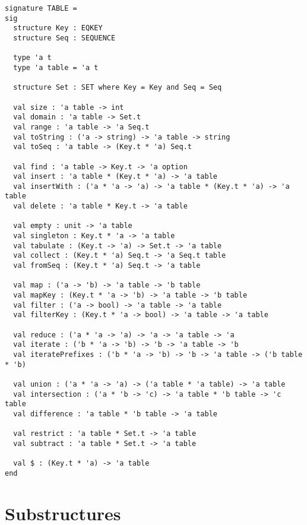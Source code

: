 \begin{cluster}
\label{grp:grm:table-interface::signature}

\begin{gram}
\label{grm:table-interface::signature}
\begin{verbatim}
signature TABLE =
sig
  structure Key : EQKEY
  structure Seq : SEQUENCE

  type 'a t
  type 'a table = 'a t

  structure Set : SET where Key = Key and Seq = Seq

  val size : 'a table -> int
  val domain : 'a table -> Set.t
  val range : 'a table -> 'a Seq.t
  val toString : ('a -> string) -> 'a table -> string
  val toSeq : 'a table -> (Key.t * 'a) Seq.t

  val find : 'a table -> Key.t -> 'a option
  val insert : 'a table * (Key.t * 'a) -> 'a table
  val insertWith : ('a * 'a -> 'a) -> 'a table * (Key.t * 'a) -> 'a table
  val delete : 'a table * Key.t -> 'a table

  val empty : unit -> 'a table
  val singleton : Key.t * 'a -> 'a table
  val tabulate : (Key.t -> 'a) -> Set.t -> 'a table
  val collect : (Key.t * 'a) Seq.t -> 'a Seq.t table
  val fromSeq : (Key.t * 'a) Seq.t -> 'a table

  val map : ('a -> 'b) -> 'a table -> 'b table
  val mapKey : (Key.t * 'a -> 'b) -> 'a table -> 'b table
  val filter : ('a -> bool) -> 'a table -> 'a table
  val filterKey : (Key.t * 'a -> bool) -> 'a table -> 'a table

  val reduce : ('a * 'a -> 'a) -> 'a -> 'a table -> 'a
  val iterate : ('b * 'a -> 'b) -> 'b -> 'a table -> 'b
  val iteratePrefixes : ('b * 'a -> 'b) -> 'b -> 'a table -> ('b table * 'b)

  val union : ('a * 'a -> 'a) -> ('a table * 'a table) -> 'a table
  val intersection : ('a * 'b -> 'c) -> 'a table * 'b table -> 'c table
  val difference : 'a table * 'b table -> 'a table

  val restrict : 'a table * Set.t -> 'a table
  val subtract : 'a table * Set.t -> 'a table

  val $ : (Key.t * 'a) -> 'a table
end
\end{verbatim}

\end{gram}
\end{cluster}


\section{Substructures}
\label{sec:table-interface::substructures}

